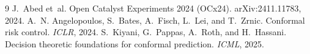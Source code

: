\documentclass[10pt,twocolumn]{article}
\begin{document}
{\small

\begin{thebibliography}{9}
J.~Abed et~al.
\newblock Open Catalyst Experiments 2024 (OCx24).
\newblock arXiv:2411.11783, 2024.
A.~N. Angelopoulos, S.~Bates, A.~Fisch, L.~Lei, and T.~Zrnic.
\newblock Conformal risk control.
\newblock \emph{ICLR}, 2024.
S.~Kiyani, G.~Pappas, A.~Roth, and H.~Hassani.
\newblock Decision theoretic foundations for conformal prediction.
\newblock \emph{ICML}, 2025.
\end{thebibliography}
}
\end{document}
